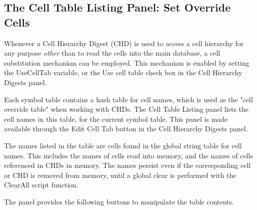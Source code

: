 \subsection{The {\cb Cell Table Listing} Panel: Set Override Cells}
\label{overtab}
Whenever a Cell Hierarchy Digest (CHD) is used to access a cell
hierarchy for any purpose {\it other} than to read the cells into the
main database, a cell substitution mechanism can be employed.  This
mechanism is enabled by setting the {\et UseCellTab} variable, or the
{\cb Use cell table} check box in the {\cb Cell Hierarchy Digests}
panel.

Each symbol table contains a hash table for cell names, which is used
as the "cell override table" when working with CHDs.  The {\cb Cell
Table Listing} panel lists the cell names in this table, for the
current symbol table.  This panel is made available through the {\cb
Edit Cell Tab} button in the {\cb Cell Hierarchy Digests} panel.

The names listed in the table are cells found in the global string
table for cell names.  This includes the names of cells read into
memory, and the names of cells referenced in CHDs in memory.  The
names persist even if the corresponding cell or CHD is removed from
memory, until a global clear is performed with the {\vt ClearAll}
script function.

The panel provides the following buttons to manipulate the table
contents.

